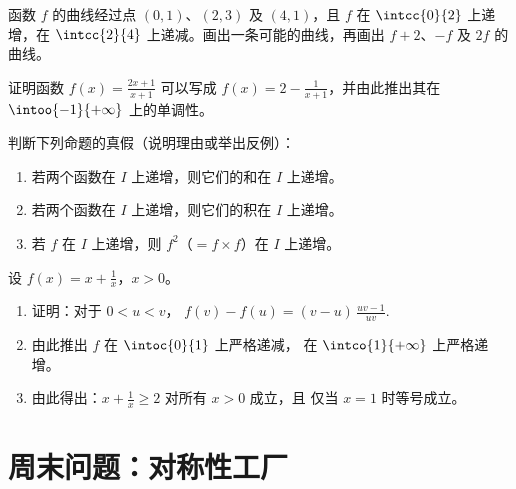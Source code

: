 \begin{exercise}[$\star\star$]\label{exo:g11:func:8}
函数 $f$ 的曲线经过点 $(0, 1)$、$(2, 3)$
及 $(4, 1)$，且 $f$ 在 $\intcc{0}{2}$ 上递增，在
$\intcc{2}{4}$ 上递减。画出一条可能的曲线，再画出
$f + 2$、$-f$ 及 $2f$ 的曲线。
\end{exercise}

\begin{exercise}[$\star\star$]\label{exo:g11:func:9}
证明函数 $f(x) = \frac{2x+1}{x+1}$ 可以写成
$f(x) = 2 - \frac{1}{x+1}$，并由此推出其在
$\intoo{-1}{+\infty}$ 上的单调性。
\end{exercise}

\begin{exercise}[$\star\star$]\label{exo:g11:func:10}
判断下列命题的真假（说明理由或举出反例）：
\begin{enumerate}
  \item 若两个函数在 $I$ 上递增，则它们的和在 $I$ 上递增。
  \item 若两个函数在 $I$ 上递增，则它们的积在
        $I$ 上递增。
  \item 若 $f$ 在 $I$ 上递增，则 $f^2$（$= f \times f$）在
        $I$ 上递增。
\end{enumerate}
\end{exercise}

\begin{exercise}[$\star\star\star$]\label{exo:g11:func:11}
设 $f(x) = x + \frac{1}{x}$，$x > 0$。
\begin{enumerate}
  \item 证明：对于 $0 < u < v$，
        $f(v) - f(u) = (v - u)\,\frac{uv - 1}{uv}$.
  \item 由此推出 $f$ 在 $\intoc{0}{1}$ 上严格递减，
        在 $\intco{1}{+\infty}$ 上严格递增。
  \item 由此得出：$x + \frac1x \geq 2$ 对所有 $x > 0$ 成立，且
        仅当 $x = 1$ 时等号成立。
\end{enumerate}
\end{exercise}

\section{周末问题：对称性工厂}

